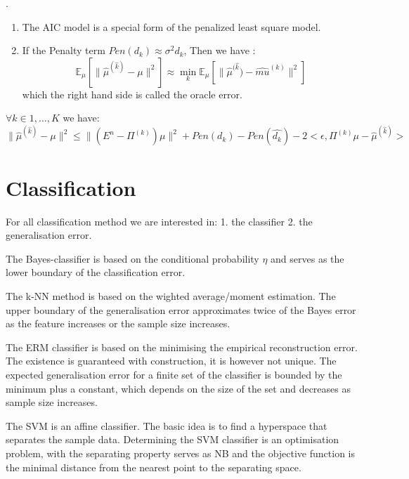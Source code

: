 \begin{remark}.
\begin{enumerate}
    \item The AIC model is a special form of the penalized least square model. 
    \item If the Penalty term $Pen(d_k) \approx \sigma^2 d_k$, Then we have :
    \begin{equation}
        \mathbb{E}_{\mu}[\| \hat{\mu}^{(\hat{k})} - \mu \|^2] \approx \min_k \mathbb{E}_{\mu}[\| \hat{\mu}^{(\hat{k}}) - \hat{mu}^{(k)} \|^2]
    \end{equation}
    which the right hand side is called the oracle error.
\end{enumerate}
\end{remark}

\begin{lemma}
$\forall k \in {1, \dots, K}$ we have:
\begin{equation}
    \| \hat{\mu}^{(\hat{k})} - \mu \|^2 \leq \| (E^n - \Pi^{(k)}) \mu\|^2 + Pen(d_k) - Pen(\hat{d_k}) - 2<\epsilon, \Pi^{(k)}\mu - \hat{\mu}^{(\hat{k})}>
\end{equation}
\end{lemma}

\begin{corollary}
\end{corollary}



\section{Classification}
For all classification method we are interested in: 1. the classifier 2. the generalisation error. \par 
The Bayes-classifier is based on the conditional probability $\eta$ and serves as the lower boundary of the classification error.\par 
The k-NN method is based on the wighted average/moment estimation. The upper boundary of the generalisation error approximates twice of the Bayes error as the feature increases or the sample size increases. \par 
The ERM classifier is based on the minimising the empirical reconstruction error. The existence is guaranteed with construction, it is however not unique. The expected generalisation error for a finite set of the classifier is bounded by the minimum plus a constant, which depends on the size of the set and decreases as sample size increases. \par 
The SVM is an affine classifier. The basic idea is to find a hyperspace that separates the sample data. Determining the SVM classifier is an optimisation problem, with the separating property serves as NB and the objective function is the minimal distance from the nearest point to the separating space.






